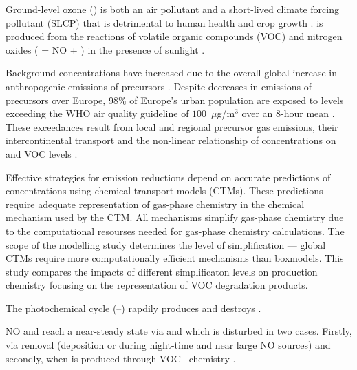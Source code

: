 Ground-level ozone () is both an air pollutant and a short-lived climate forcing pollutant (SLCP) that is detrimental to human health and crop growth \citep{AQEU:2014}. 
 is produced from the reactions of volatile organic compounds (VOC) and nitrogen oxides ( = NO + ) in the presence of sunlight \citep{Atkinson:2000}.

Background  concentrations have increased due to the overall global increase in anthropogenic emissions of  precursors \citep{HTAP:2010}.
Despite decreases in emissions of  precursors over Europe, $98$\% of Europe's urban population are exposed to levels exceeding the WHO air quality guideline of \mbox{$100$ $\mu$g/m$^3$} over an \mbox{$8$-hour} mean \citep{WHO:2006}. 
These exceedances result from local and regional  precursor gas emissions, their intercontinental transport and the non-linear relationship of  concentrations on  and VOC levels \citep{AQEU:2014}.

Effective strategies for emission reductions depend on accurate predictions of  concentrations using chemical transport models (CTMs). 
These predictions require adequate representation of gas-phase chemistry in the chemical mechanism used by the CTM. 
All mechanisms simplify gas-phase chemistry due to the computational resourses needed for gas-phase chemistry calculations.
The scope of the modelling study determines the level of simplification --- global CTMs require more computationally efficient mechanisms than boxmodels.
This study compares the impacts of different simplificaton levels on  production chemistry focusing on the representation of VOC degradation products.

The photochemical cycle (--) rapdily produces and destroys . 
\begin{reactionlist}
\end{reactionlist}
NO and  reach a near-steady state via  and  which is disturbed in two cases. 
Firstly, via  removal (deposition or  during night-time and near large NO sources) and secondly, when  is produced through VOC-- chemistry \citep{Sillman:1999}.

